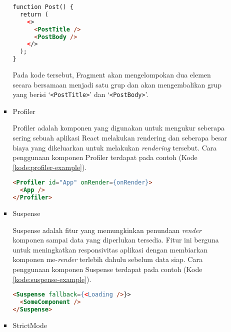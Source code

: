 \documentclass[a4paper,twoside]{article}
\begin{document}
\begin{enumerate}
\begin{itemize}
\begin{itemize}
\begin{lstlisting}[language=HTML, caption=Contoh Potongan Kode Fragment, label=kode:fragment-example]
function Post() {
  return (
    <>
      <PostTitle />
      <PostBody />
    </>
  );
}
\end{lstlisting}

Pada kode tersebut, Fragment akan mengelompokan dua elemen secara bersamaan menjadi satu grup dan akan mengembalikan grup yang berisi `\texttt{<PostTitle>}' dan `\texttt{<PostBody>}'.

        \item Profiler

        Profiler adalah komponen yang digunakan untuk mengukur seberapa sering sebuah aplikasi React melakukan rendering dan seberapa besar biaya yang dikeluarkan untuk melakukan \textit{rendering} tersebut. Cara penggunaan komponen Profiler terdapat pada contoh (Kode \ref{kode:profiler-example}).

\begin{lstlisting}[language=HTML, caption=Contoh Potongan Kode Profiler, label=kode:profiler-example]
<Profiler id="App" onRender={onRender}>
  <App />
</Profiler>
\end{lstlisting}

        \item Suspense

        Suspense adalah fitur yang memungkinkan penundaan \textit{render} komponen sampai data yang diperlukan tersedia. Fitur ini berguna untuk meningkatkan responsivitas aplikasi dengan membiarkan komponen me-\textit{render} terlebih dahulu sebelum data siap. Cara penggunaan komponen Suspense terdapat pada contoh (Kode \ref{kode:suspense-example}).

\begin{lstlisting}[language=HTML, caption=Contoh Potongan Kode Suspense, label=kode:suspense-example]
<Suspense fallback={<Loading />}>
  <SomeComponent />
</Suspense>
\end{lstlisting}

        \item StrictMode


\end{itemize}
\end{itemize}
\end{enumerate}
\end{document}
